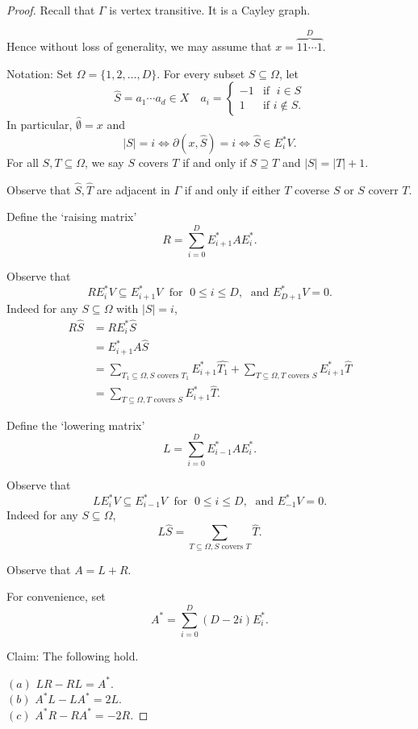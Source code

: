 \documentclass[
]{book}
\theoremstyle{definition}
\theoremstyle{definition}
\theoremstyle{definition}
\theoremstyle{definition}
\theoremstyle{remark}
\begin{document}
\begin{proof}
Recall that \(\Gamma\) is vertex transitive. It is a Cayley graph.

Hence without loss of generality, we may assume that
\(x = \overbrace{11\cdots 1}^{D}\).

Notation: Set \(\Omega = \{1, 2, \ldots, D\}\). For every subset \(S \subseteq \Omega\), let
\[\hat{S} = a_1\cdots a_d \in X \quad a_i = \begin{cases} -1 & \text{if }\; i\in S\\ 1 & \text{if } i\not\in S.\end{cases}\]
In particular, \(\hat{\emptyset} = x\) and
\[|S| = i \Leftrightarrow \partial(x, \hat{S}) = i \Leftrightarrow \hat{S}\in E^*_iV.\]
For all \(S, T\subseteq \Omega\), we say \(S\) covers \(T\) if and only if \(S\supseteq T\) and \(|S| = |T| +1\).

Observe that \(\hat{S}, \hat{T}\) are adjacent in \(\Gamma\) if and only if either \(T\) coverse \(S\) or \(S\) coverr \(T\).

Define the `raising matrix'
\[R = \sum_{i=0}^D E^*_{i+1}AE^*_i.\]

Observe that
\[RE_i^*V \subseteq E^*_{i+1} V \; \text{ for }\; 0\leq i \leq D, \; \text{ and }E^*_{D+1}V = 0.\]
Indeed for any \(S\subseteq \Omega\) with \(|S| = i\),
\begin{align}
R\hat{S} & = RE^*_i\hat{S} \\
& = E^*_{i+1}A\hat{S} \\
& = \sum_{T_1 \subseteq \Omega, S \text{ covers }T_1} E^*_{i+1}\widehat{T_1} + \sum_{T \subseteq \Omega, T \text{ covers }S} E^*_{i+1}\hat{T}\\
& = \sum_{T \subseteq \Omega, T \text{ covers }S} E^*_{i+1}\hat{T}.
\end{align}

Define the `lowering matrix'
\[L = \sum_{i=0}^D E^*_{i-1}AE^*_i.\]

Observe that
\[LE_i^*V \subseteq E^*_{i-1}V \; \text{ for }\; 0\leq i \leq D, \; \text{ and }E^*_{-1}V = 0.\]
Indeed for any \(S\subseteq \Omega\),
\[L\hat{S} = \sum_{T\subseteq \Omega, S \text{ covers }T} \hat{T}.\]

Observe that \(A = L + R\).

For convenience, set
\[A^* = \sum_{i=0}^D (D-2i)E_i^*.\]

Claim: The following hold.

\((a)\) \(LR - RL = A^*\).\\
\((b)\) \(A^*L - LA^* = 2L\).\\
\((c)\) \(A^*R - RA^* = -2R\).


\end{proof}
\end{document}
